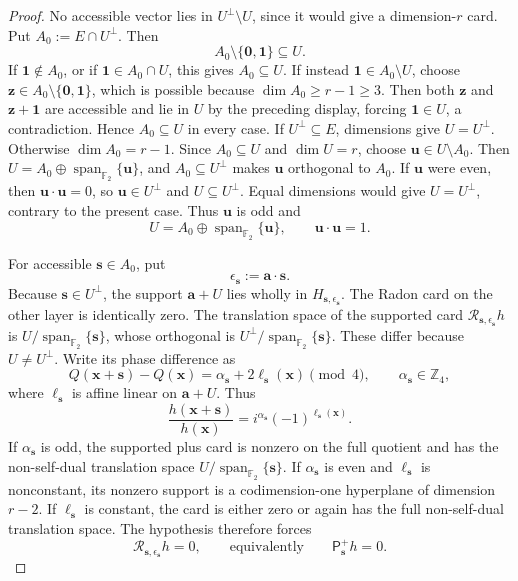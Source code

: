 \documentclass[11pt,letterpaper,onecolumn]{article}
\theoremstyle{plain}
\theoremstyle{definition}
\theoremstyle{remark}
\newcommand{\Ftwo}{\mathbb F_2}
\newcommand{\Span}{\operatorname{span}}
\newcommand{\one}{\mathbf 1}
\newcommand{\zero}{\mathbf 0}
\begin{document}
\begin{proof}
No accessible vector lies in \(U^\perp\setminus U\), since it would give a
dimension-\(r\) card.  Put \(A_0:=E\cap U^\perp\).  Then
\[
 A_0\setminus\{\zero,\one\}\subseteq U.
\]
If \(\one\notin A_0\), or if \(\one\in A_0\cap U\), this gives
\(A_0\subseteq U\).  If instead \(\one\in A_0\setminus U\), choose
\({\mathbf z}\in A_0\setminus\{\zero,\one\}\), which is possible because
\(\dim A_0\ge r-1\ge3\). Then both \({\mathbf z}\) and \({\mathbf z}+\one\) are
accessible and lie in \(U\) by the preceding display, forcing
\(\one\in U\), a contradiction.  Hence \(A_0\subseteq U\) in every case.
If
\(U^\perp\subseteq E\), dimensions give
\(U=U^\perp\).  Otherwise \(\dim A_0=r-1\).  Since
\(A_0\subseteq U\) and \(\dim U=r\), choose \({\mathbf{u}}\in U\setminus A_0\).
Then \(U=A_0\oplus\Span_{\Ftwo}\{{\mathbf{u}}\}\), and
\(A_0\subseteq U^\perp\) makes \({\mathbf{u}}\) orthogonal to \(A_0\).  If \({\mathbf{u}}\) were
even, then \({\mathbf{u}}\cdot {\mathbf{u}}=0\), so \({\mathbf{u}}\in U^\perp\) and
\(U\subseteq U^\perp\). Equal dimensions would give \(U=U^\perp\),
contrary to the present case.  Thus \({\mathbf{u}}\) is odd and
\hypertarget{eq:rm-near-self-dual}{}
\begin{equation*}
 U=A_0\oplus\Span_{\Ftwo}\{{\mathbf{u}}\},
  \qquad {\mathbf{u}}\cdot {\mathbf{u}}=1.
\end{equation*}

For accessible \({\mathbf{s}}\in A_0\), put
\[
 \epsilon_{\mathbf{s}}:={\mathbf{a}}\cdot {\mathbf{s}}.
\]
Because \({\mathbf{s}}\in U^\perp\), the support \({\mathbf{a}}+U\) lies wholly in
\(H_{{\mathbf{s}},\epsilon_{\mathbf{s}}}\). The Radon card on the other layer is identically zero.  The
translation space of the supported card
\(\mathcal R_{{\mathbf{s}},\epsilon_{\mathbf{s}}}h\) is
\(U/\Span_{\Ftwo}\{{\mathbf{s}}\}\), whose orthogonal is
\(U^\perp/\Span_{\Ftwo}\{{\mathbf{s}}\}\). These differ because \(U\ne U^\perp\).
Write its phase difference as
\[
 Q({\mathbf{x}}+{\mathbf{s}})-Q({\mathbf{x}})=\alpha_{\mathbf{s}}+2\ell_{\mathbf{s}}({\mathbf{x}})\pmod4,
 \qquad \alpha_{\mathbf{s}}\in\mathbb Z_4,
\]
where \(\ell_{\mathbf{s}}\) is affine linear on \({\mathbf{a}}+U\).  Thus
\[
 \frac{h({\mathbf{x}}+{\mathbf{s}})}{h({\mathbf{x}})}
 =i^{\alpha_{\mathbf{s}}}(-1)^{\ell_{\mathbf{s}}({\mathbf{x}})}.
\]
If \(\alpha_{\mathbf{s}}\) is odd, the supported plus card is nonzero on the full
quotient and has the non-self-dual translation space
\(U/\Span_{\Ftwo}\{{\mathbf{s}}\}\).
If \(\alpha_{\mathbf{s}}\) is even and \(\ell_{\mathbf{s}}\) is nonconstant, its nonzero support
is a codimension-one hyperplane of dimension \(r-2\).  If \(\ell_{\mathbf{s}}\) is
constant, the card is either zero or again has the full non-self-dual
translation space.  The hypothesis therefore forces
\[
 \mathcal R_{{\mathbf{s}},\epsilon_{\mathbf{s}}}h=0,
 \qquad\text{equivalently}\qquad
 \mathsf P_{\mathbf{s}}^+h=0.
\]


\end{proof}
\end{document}

